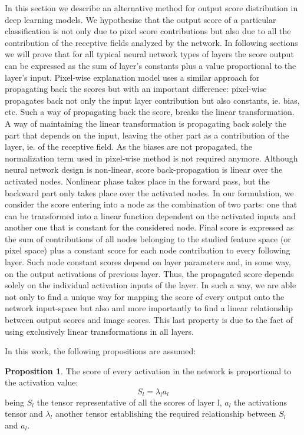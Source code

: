 \documentclass[review]{elsarticle}
\theoremstyle{definition} %
\newtheorem{proposition}{Proposition}%
\theoremstyle{remark}
\begin{document}
In this section we describe an alternative method for output score distribution in deep learning models. We hypothesize that the output score of a particular classification is not only due to pixel score contributions but also due to all the contribution of the receptive fields analyzed by the network. In following sections we will prove that for all typical neural network types of layers the score output can be expressed as the sum of layer's constants plus a value proportional to the layer's input.  Pixel-wise explanation model uses a similar approach for propagating back the scores but with an important difference: pixel-wise \cite{bach2015pixel} propagates back not only the input layer contribution but also constants, ie. bias, etc. Such a way of propagating back the score, breaks the linear transformation. A way of maintaining the linear transformation is propagating back solely the part that depends on the input, leaving the other part as a contribution of the layer, ie. of the receptive field. As the biases are not propagated, the normalization term used in pixel-wise method is not required anymore. Although neural network design is non-linear, score back-propagation is linear over the activated nodes. Nonlinear phase takes place in the forward pass, but the backward part only takes place over the activated nodes. In our formulation, we consider the score entering into a node as the combination of two parts: one that can be transformed into a linear function dependent on the activated inputs and another one that is constant for the considered node.  Final score is expressed as the sum of contributions of all nodes belonging to the studied feature space (or pixel space) plus a constant score for each node contribution  to every following layer.
Such node constant scores depend on layer parameters and, in some way, on the output activations of previous layer. Thus, the propagated score depends solely on the individual activation inputs of the layer. In such a way, we are able not only to find a unique way for mapping the score of every output onto the network input-space but also and more importantly to find a linear relationship between output scores and image scores. This last property is due to the fact of using exclusively linear transformations in all layers.

In this work, the following propositions are assumed:

\begin{proposition}
	The score of every activation in the network is proportional to the activation value:
	\begin{equation}
	S_l = \lambda_l a_{l}
	\end{equation}
	being $S_l$ the tensor representative of all the scores of layer l, $a_l$ the activations tensor and $\lambda_l$ another tensor establishing the required relationship between $S_l$ and $a_l$.
\end{proposition}
\end{document}
